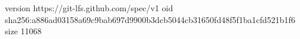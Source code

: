 version https://git-lfs.github.com/spec/v1
oid sha256:a886ad03158a69c9bab697d9900b3dcb5044cb31650fd48f5f1ba1cfd521b1f6
size 11068
